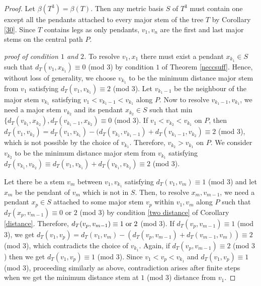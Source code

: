 \documentclass{article}
\theoremstyle{definition}
\numberwithin{equation}{section}
\begin{document}
\begin{proof}
Let $\beta{(T^{3})}=\beta{(T)}$. Then any metric basis $S$ of $T^{3}$ must contain one except all the pendants attached to every major stem of the tree $T$ by Corollary \ref{30}. Since $T$ contains legs as only pendants, $v_{1},v_{n}$ are the first and last major stems on the central path $P$. 


\vspace{0.4em}
\noindent \textit{proof of condition $1$ and $2$.}
To resolve $v_{1}, x_{1}$ there must exist a pendant $x_{k_{1}}\in S$ such that $d_{T}(v_{1},x_{k_{1}})\equiv0$ (mod $3$) by condition $1$ of Theorem \ref{neccsuff}. Hence, without loss of generality, we choose $v_{k_{1}}$ to be the minimum distance major stem from $v_{1}$ satisfying $d_{T}(v_{1},v_{k_{1}})\equiv 2$ (mod $3$). Let $v_{k_{1}-1}$ be the neighbour of the major stem $v_{k_{1}}$ satisfying $v_{1}<v_{k_{1}-1}<v_{k_{1}}$ along $P$. Now to resolve $v_{k_{1}-1}, v_{k_{1}}$, we need a major stem $v_{k_{2}}$ and its pendant $x_{k_{2}}\in S$ such that min $\{d_{T}(v_{k_{1}},x_{k_{2}}),d_{T}(v_{k_{1}-1},x_{k_{2}})\equiv 0$ (mod $3$). If $v_{1}<v_{k_{2}}<v_{k_{1}}$ on $P$, then $d_{T}(v_{1},v_{k_{2}})=d_{T}(v_{1},v_{k_{1}})-(d_{T}(v_{k_{1}},v_{k_{1}-1})+d_{T}(v_{k_{1}-1},v_{k_{2}})\equiv 2$ (mod $3$), which is not possible by the choice of $v_{k_{1}}$. Therefore, $v_{k_{2}}>v_{k_{1}}$ on $P$. We consider $v_{k_{2}}$ to be the minimum distance major stem from $v_{k_{1}}$ satisfying $d_{T}(v_{k_{1}},v_{k_{2}})\equiv d_{T}(v_{1},v_{k_{1}})+d_{T}(v_{k_{1}},v_{k_{2}})\equiv 2$ (mod $3$). 


\vspace{0.7em}
Let there be a stem $v_{m}$ between $v_{1}, v_{k_{1}}$ satisfying $d_{T}(v_{1},v_{m})\equiv 1$ (mod $3$) and let $x_{m}$ be the pendant of $v_{m}$ which is not in $S$. Then, to resolve $x_{m},v_{m-1}$, we need a pendant $x_{p}\in S$ attached to some major stem $v_{p}$ within $v_{1},v_{m}$ along $P$ such that $d_{T}(x_{p},v_{m-1})\equiv 0 $ or $2$ (mod $3$) by condition \ref{two distance} of Corollary \ref{distance}.
Therefore, $d_{T}(v_{p},v_{m-1})\equiv 1 \hspace{0.3em} \text{or} \hspace{0.3em} 2$ (mod $3$). If $d_{T}(v_{p},v_{m-1})\equiv 1 $ (mod $3$), we get $d_{T}(v_{1},v_{p})=d_{T}(v_{1},v_{m})-(d_{T}(v_{p},v_{m-1})+d_{T}(v_{m-1},v_{m}))\equiv 2$ (mod $3$), which contradicts the choice of $v_{k_{1}}$. 
Again, if $d_{T}(v_{p},v_{m-1})\equiv 2$ (mod $3$) then we get $d_{T}(v_{1},v_{p})\equiv 1$ (mod $3$).
Since $v_{1}<v_{p}<v_{k_{1}}$ and $d_{T}(v_{1},v_{p})\equiv 1$ (mod $3$), proceeding similarly as above, contradiction arises after finite steps when we get the minimum distance stem at $1$ (mod $3$) distance from $v_{1}$.
 

\end{proof}
\end{document}
